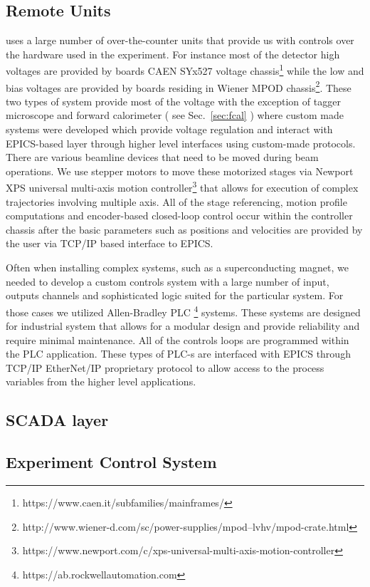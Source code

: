 \subsection{Remote Units \label{sec:controlsinterface}}
\gx{} uses a large number of over-the-counter units that provide us with controls over the hardware used in the experiment. For instance most of the detector high voltages are provided by boards CAEN SYx527 voltage chassis\footnote{https://www.caen.it/subfamilies/mainframes/} while the low and bias voltages are provided by boards residing in Wiener MPOD chassis\footnote{http://www.wiener-d.com/sc/power-supplies/mpod--lvhv/mpod-crate.html}. These two types of system provide most of the voltage with the exception of tagger microscope and forward calorimeter ( see Sec.~\ref{sec:fcal} ) where custom made systems were developed which provide voltage regulation and interact with EPICS-based layer through higher level interfaces using custom-made protocols.  
There are various beamline devices that need to be moved during beam operations. We use stepper motors to move these motorized stages via Newport XPS universal multi-axis motion controller\footnote{https://www.newport.com/c/xps-universal-multi-axis-motion-controller} that allows for execution of complex trajectories involving multiple axis. All of the stage referencing, motion profile computations and encoder-based closed-loop control occur within the controller chassis after the basic parameters such as positions and velocities are provided by the user via TCP/IP based interface to EPICS.   

Often when installing complex systems, such as a superconducting magnet, we needed to develop a custom controls system with a large number of input, outputs channels and sophisticated logic suited for the particular system. For those cases we utilized Allen-Bradley PLC \footnote{https://ab.rockwellautomation.com} systems. These systems are designed for industrial system that allows for a modular design and provide reliability and require minimal maintenance. All of the controls loops are programmed within the PLC application. These types of PLC-s are interfaced with EPICS through TCP/IP EtherNet/IP proprietary protocol to allow access to the process variables from the higher level applications.  
\subsection{SCADA layer \label{sec:archiver}}
\subsection{Experiment Control System \label{sec:alarms}}

